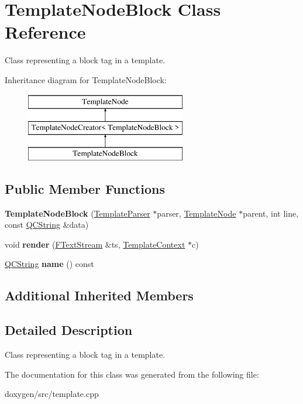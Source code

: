 \hypertarget{class_template_node_block}{}\section{Template\+Node\+Block Class Reference}
\label{class_template_node_block}


Class representing a \textquotesingle{}block\textquotesingle{} tag in a template.  


Inheritance diagram for Template\+Node\+Block\+:\begin{figure}[H]
\begin{center}
\leavevmode
\includegraphics[height=3.000000cm]{class_template_node_block}
\end{center}
\end{figure}
\subsection*{Public Member Functions}
\begin{DoxyCompactItemize}
\item 
\mbox{\label{class_template_node_block_a1c6e8ec8cc52b1175a2e726b0f89172e}} 
{\bfseries Template\+Node\+Block} (\mbox{\hyperlink{class_template_parser}{Template\+Parser}} $\ast$parser, \mbox{\hyperlink{class_template_node}{Template\+Node}} $\ast$parent, int line, const \mbox{\hyperlink{class_q_c_string}{Q\+C\+String}} \&data)
\item 
\mbox{\label{class_template_node_block_ab5b5953d9e1ae88ef8a1dc11afff6bfe}} 
void {\bfseries render} (\mbox{\hyperlink{class_f_text_stream}{F\+Text\+Stream}} \&ts, \mbox{\hyperlink{class_template_context}{Template\+Context}} $\ast$c)
\item 
\mbox{\label{class_template_node_block_a40c7b04c835b6caf2788095c526fdea5}} 
\mbox{\hyperlink{class_q_c_string}{Q\+C\+String}} {\bfseries name} () const
\end{DoxyCompactItemize}
\subsection*{Additional Inherited Members}


\subsection{Detailed Description}
Class representing a \textquotesingle{}block\textquotesingle{} tag in a template. 

The documentation for this class was generated from the following file\+:\begin{DoxyCompactItemize}
\item 
doxygen/src/template.\+cpp\end{DoxyCompactItemize}
